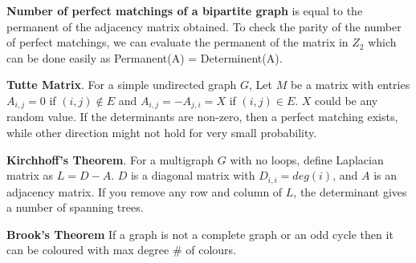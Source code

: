 \textbf{Number of perfect matchings of a bipartite graph} is equal to the permanent of the adjacency matrix obtained. To check the parity of the number of perfect matchings, we can evaluate the permanent of the matrix in $Z_{2}$ which can be done easily as Permanent(A) = Determinent(A).

\textbf{Tutte Matrix}. For a simple undirected graph $G$, Let $M$ be a matrix with entries $A_{i, j} = 0$ if $(i, j) \notin E$ and $A_{i, j} = -A_{j, i} = X$ if $(i, j) \in E$. $X$ could be any random value. If the determinants are non-zero, then a perfect matching exists, while other direction might not hold for very small probability.

\textbf{Kirchhoff's Theorem}. For a multigraph $G$ with no loops, define Laplacian matrix as $L = D - A$. $D$ is a diagonal matrix with $D_{i, i} = deg(i)$, and $A$ is an adjacency matrix. If you remove any row and column of $L$, the determinant gives a number of spanning trees.

\textbf{Brook's Theorem} If a graph is not a complete graph or an odd cycle then it can be coloured with max degree \# of colours.
